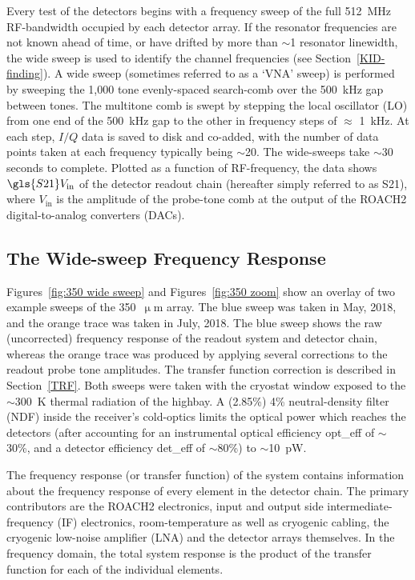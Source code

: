 Every test of the detectors begins with a frequency sweep of the full 512~MHz RF-bandwidth occupied by each detector array. If the resonator frequencies are not known ahead of time, or have drifted by more than $\sim$1 resonator linewidth, the wide sweep is used to identify the channel frequencies (see Section~\ref{KID-finding}). A wide sweep (sometimes referred to as a `VNA' sweep) is performed by sweeping the 1,000 tone evenly-spaced search-comb over the 500~kHz gap between tones. The multitone comb is swept by stepping the local oscillator (LO) from one end of the 500~kHz gap to the other in frequency steps of $\approx$ 1~kHz. At each step, $I/Q$ data is saved to disk and co-added, with the number of data points taken at each frequency typically being $\sim$20. The wide-sweeps take $\sim$30 seconds to complete. Plotted as a function of RF-frequency, the data shows $\gls{S21}V_{\mathrm{in}}$ of the detector readout chain (hereafter simply referred to as \gls{S21}), where $V_{\mathrm{in}}$ is the amplitude of the probe-tone comb at the output of the ROACH2 digital-to-analog converters (DACs).

\subsection{The Wide-sweep Frequency Response}\label{freq response}

Figures~\ref{fig:350 wide sweep} and Figures~\ref{fig:350 zoom} show an overlay of two example sweeps of the 350~$\upmu$m array. The blue sweep was taken in May, 2018, and the orange trace was taken in July, 2018. The blue sweep shows the raw (uncorrected) frequency response of the readout system and detector chain, whereas the orange trace was produced by applying several corrections to the readout probe tone amplitudes. The transfer function correction is described in Section~\ref{TRF}. Both sweeps were taken with the cryostat window exposed to the $\sim$300~K thermal radiation of the highbay. A (2.85\%) 4\% neutral-density filter (NDF) inside the receiver's cold-optics limits the optical power which reaches the detectors (after accounting for an instrumental optical efficiency \gls{opt_eff} of $\sim$30\%, and a detector efficiency \gls{det_eff} of $\sim$80\%) to $\sim$10~pW.

The frequency response (or transfer function) of the system contains information about the frequency response of every element in the detector chain. The primary contributors are the ROACH2 electronics, input and output side intermediate-frequency (IF) electronics, room-temperature as well as cryogenic cabling, the cryogenic low-noise amplifier (LNA) and the detector arrays themselves. In the frequency domain, the total system response is the product of the transfer function for each of the individual elements.

